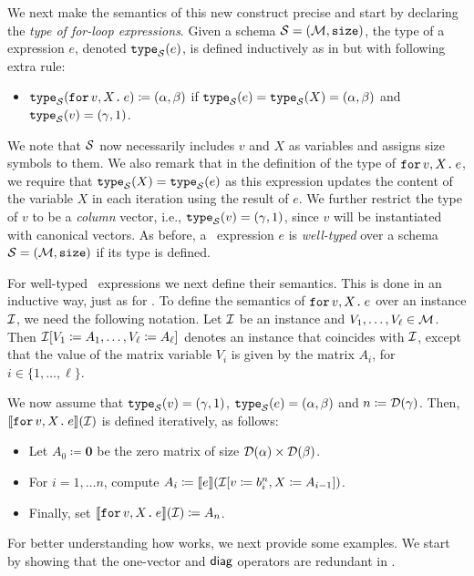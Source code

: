 We next make the semantics of this new construct precise and start by
declaring the \textit{type of for-loop expressions}.
Given a schema $\mathcal{S}=(\mathcal{M},\texttt{size})$, the type of a \langfor expression $e$, denoted $\texttt{type}_{\mathcal{S}}(e)$, is defined inductively as in \lang but with following extra rule:
\begin{itemize}
\item $\texttt{type}_{\mathcal{S}}(\texttt{for}\, v,X \texttt{.}\, e) \coloneqq  (\alpha,\beta)$ if 
$\texttt{type}_{\mathcal{S}}(e)=\texttt{type}_{\mathcal{S}}(X) =(\alpha,\beta)$ and $\texttt{type}_{\mathcal{S}}(v) = (\gamma,1)$.
\end{itemize}
We note that $\mathcal{S}$ now necessarily includes $v$ and $X$ as variables and assigns size symbols to them.
We also remark that in the definition of the type of $\texttt{for}\, v,X \texttt{.}\, e$, we require that $\texttt{type}_{\mathcal{S}}(X) = \texttt{type}_{\mathcal{S}}(e)$ as this expression updates the content of the variable $X$ in each iteration using the result of $e$. We further restrict the type of 
$v$ to be a \textit{column} vector, i.e., $\texttt{type}_{\mathcal{S}}(v)=(\gamma,1)$, since $v$ will be instantiated with canonical vectors. As before,
a \langfor\ expression $e$ is \textit{well-typed} over a schema $\mathcal{S}=(\mathcal{M},\texttt{size})$ if its type is defined. 

For well-typed \langfor\ expressions we next define their semantics. This is done in an inductive way, just as for \lang. To define the semantics of $\texttt{for}\, v,X \texttt{.}\, e$ over an instance $\mathcal{I}$, we need the following notation. Let $\mathcal{I}$ be an instance and $V_1,\ldots,V_\ell\in \mathcal{M}$. Then $\mathcal{I}[V_1 \coloneqq  A_1, \ldots, V_\ell\coloneqq A_\ell]$ denotes an instance that coincides with $\mathcal{I}$, except that the value of the matrix variable $V_i$ is given by the matrix $A_i$, for $i\in\lbrace 1, \ldots, \ell\rbrace$.

We now assume that
$\texttt{type}_{\mathcal{S}}(v)= (\gamma,1)$, $\texttt{type}_{\mathcal{S}}(e) = (\alpha,\beta)$ and $n \coloneqq  \mathcal{D}(\gamma)$. Then, $\llbracket \texttt{for}\, v,X \texttt{.}\, e \rrbracket(\mathcal{I})$ is defined iteratively, as follows:
\begin{itemize}
\item Let $A_0 \coloneqq  \mathbf{0}$ be the zero matrix of size $\mathcal{D}(\alpha)\times \mathcal{D}(\beta)$.
\item For $i=1,\ldots n$, compute $A_i\coloneqq  \llbracket e \rrbracket(\mathcal{I}[v \coloneqq  b^{n}_i, X\coloneqq  A_{i-1}])$.
\item Finally, set $\llbracket \texttt{for}\, v,X \texttt{.}\, e \rrbracket(\mathcal{I})\coloneqq  A_{n}$.
\end{itemize}

For better understanding how \langfor  works, we next provide some  examples.
We start by showing that the one-vector and $\textsf{diag}$ operators are redundant
in \langfor.

